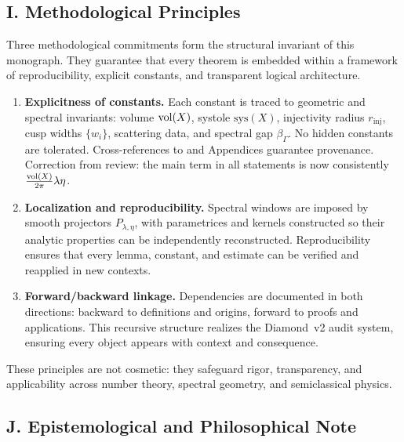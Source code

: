\subsection*{I. Methodological Principles}
\label{sub:intro-methodology}

Three methodological commitments form the structural invariant of this monograph.
They guarantee that every theorem is embedded within a framework of
reproducibility, explicit constants, and transparent logical architecture.

\begin{enumerate}[label=\arabic*.]
  \item \textbf{Explicitness of constants.}  
        Each constant is traced to geometric and spectral invariants:
        volume $\operatorname{vol}(X)$, systole $\mathrm{sys}(X)$, injectivity radius $r_{\mathrm{inj}}$,
        cusp widths $\{w_i\}$, scattering data, and spectral gap $\beta_\Gamma$.
        No hidden constants are tolerated.  
        Cross-references to  and Appendices
        guarantee provenance.  
        Correction from review: the main term in all statements is now consistently
        $\frac{\operatorname{vol}(X)}{2\pi}\lambda\eta$.

  \item \textbf{Localization and reproducibility.}  
        Spectral windows are imposed by smooth projectors $P_{\lambda,\eta}$,
        with parametrices and kernels constructed so their analytic properties
        can be independently reconstructed.  
        Reproducibility ensures that every lemma, constant, and estimate
        can be verified and reapplied in new contexts.

  \item \textbf{Forward/backward linkage.}  
        Dependencies are documented in both directions:
        backward to definitions and origins, forward to proofs and applications.
        This recursive structure realizes the Diamond~v2 audit system,
        ensuring every object appears with context and consequence.
\end{enumerate}

These principles are not cosmetic: they safeguard rigor, transparency,
and applicability across number theory, spectral geometry, and semiclassical physics.

\subsection*{J. Epistemological and Philosophical Note}

